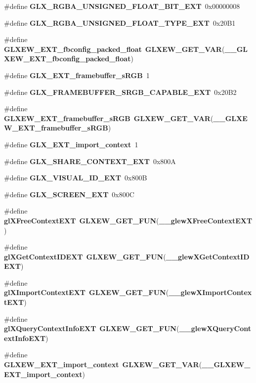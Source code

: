 \begin{DoxyCompactItemize}
\item 
\#define {\bf G\+L\+X\+\_\+\+R\+G\+B\+A\+\_\+\+U\+N\+S\+I\+G\+N\+E\+D\+\_\+\+F\+L\+O\+A\+T\+\_\+\+B\+I\+T\+\_\+\+E\+XT}~0x00000008
\item 
\#define {\bf G\+L\+X\+\_\+\+R\+G\+B\+A\+\_\+\+U\+N\+S\+I\+G\+N\+E\+D\+\_\+\+F\+L\+O\+A\+T\+\_\+\+T\+Y\+P\+E\+\_\+\+E\+XT}~0x20\+B1
\item 
\#define {\bf G\+L\+X\+E\+W\+\_\+\+E\+X\+T\+\_\+fbconfig\+\_\+packed\+\_\+float}~{\bf G\+L\+X\+E\+W\+\_\+\+G\+E\+T\+\_\+\+V\+AR}({\bf \+\_\+\+\_\+\+G\+L\+X\+E\+W\+\_\+\+E\+X\+T\+\_\+fbconfig\+\_\+packed\+\_\+float})
\item 
\#define {\bf G\+L\+X\+\_\+\+E\+X\+T\+\_\+framebuffer\+\_\+s\+R\+GB}~1
\item 
\#define {\bf G\+L\+X\+\_\+\+F\+R\+A\+M\+E\+B\+U\+F\+F\+E\+R\+\_\+\+S\+R\+G\+B\+\_\+\+C\+A\+P\+A\+B\+L\+E\+\_\+\+E\+XT}~0x20\+B2
\item 
\#define {\bf G\+L\+X\+E\+W\+\_\+\+E\+X\+T\+\_\+framebuffer\+\_\+s\+R\+GB}~{\bf G\+L\+X\+E\+W\+\_\+\+G\+E\+T\+\_\+\+V\+AR}({\bf \+\_\+\+\_\+\+G\+L\+X\+E\+W\+\_\+\+E\+X\+T\+\_\+framebuffer\+\_\+s\+R\+GB})
\item 
\#define {\bf G\+L\+X\+\_\+\+E\+X\+T\+\_\+import\+\_\+context}~1
\item 
\#define {\bf G\+L\+X\+\_\+\+S\+H\+A\+R\+E\+\_\+\+C\+O\+N\+T\+E\+X\+T\+\_\+\+E\+XT}~0x800A
\item 
\#define {\bf G\+L\+X\+\_\+\+V\+I\+S\+U\+A\+L\+\_\+\+I\+D\+\_\+\+E\+XT}~0x800B
\item 
\#define {\bf G\+L\+X\+\_\+\+S\+C\+R\+E\+E\+N\+\_\+\+E\+XT}~0x800C
\item 
\#define {\bf gl\+X\+Free\+Context\+E\+XT}~{\bf G\+L\+X\+E\+W\+\_\+\+G\+E\+T\+\_\+\+F\+UN}({\bf \+\_\+\+\_\+glew\+X\+Free\+Context\+E\+XT})
\item 
\#define {\bf gl\+X\+Get\+Context\+I\+D\+E\+XT}~{\bf G\+L\+X\+E\+W\+\_\+\+G\+E\+T\+\_\+\+F\+UN}({\bf \+\_\+\+\_\+glew\+X\+Get\+Context\+I\+D\+E\+XT})
\item 
\#define {\bf gl\+X\+Import\+Context\+E\+XT}~{\bf G\+L\+X\+E\+W\+\_\+\+G\+E\+T\+\_\+\+F\+UN}({\bf \+\_\+\+\_\+glew\+X\+Import\+Context\+E\+XT})
\item 
\#define {\bf gl\+X\+Query\+Context\+Info\+E\+XT}~{\bf G\+L\+X\+E\+W\+\_\+\+G\+E\+T\+\_\+\+F\+UN}({\bf \+\_\+\+\_\+glew\+X\+Query\+Context\+Info\+E\+XT})
\item 
\#define {\bf G\+L\+X\+E\+W\+\_\+\+E\+X\+T\+\_\+import\+\_\+context}~{\bf G\+L\+X\+E\+W\+\_\+\+G\+E\+T\+\_\+\+V\+AR}({\bf \+\_\+\+\_\+\+G\+L\+X\+E\+W\+\_\+\+E\+X\+T\+\_\+import\+\_\+context})

\end{DoxyCompactItemize}
